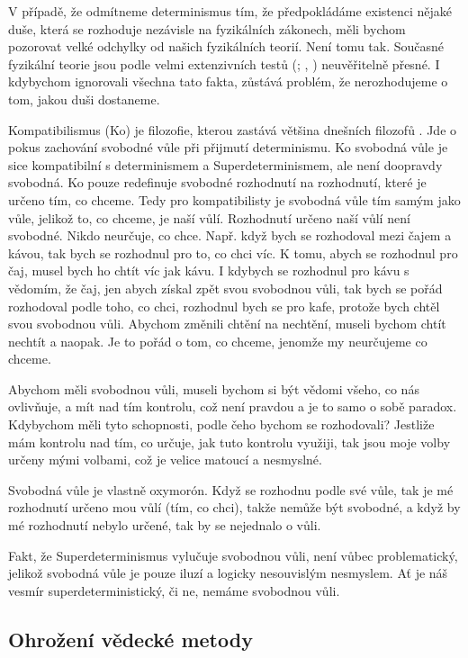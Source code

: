 V případě, že odmítneme determinismus tím, že předpokládáme existenci nějaké duše, která se rozhoduje nezávisle na fyzikálních zákonech, měli bychom pozorovat velké odchylky od našich fyzikálních teorií. Není tomu tak. Současné fyzikální teorie jsou podle velmi extenzivních testů (\cite{GenRelAcc}; , \cite*{QEDAcc}) neuvěřitelně přesné. I kdybychom ignorovali všechna tato fakta, zůstává problém, že nerozhodujeme o tom, jakou duši dostaneme.

Kompatibilismus (Ko) je filozofie, kterou zastává většina dnešních filozofů \parencite{FWSur}. Jde o pokus zachování svobodné vůle při přijmutí determinismu. Ko svobodná vůle je sice kompatibilní s determinismem a Superdeterminismem, ale není doopravdy svobodná. Ko pouze redefinuje svobodné rozhodnutí na rozhodnutí, které je určeno tím, co chceme. Tedy pro kompatibilisty je svobodná vůle tím samým jako vůle, jelikož to, co chceme, je naší vůlí. Rozhodnutí určeno naší vůlí není svobodné. Nikdo neurčuje, co chce. Např. když bych se rozhodoval mezi čajem a kávou, tak bych se rozhodnul pro to, co chci víc. K tomu, abych se rozhodnul pro čaj, musel bych ho chtít víc jak kávu. I kdybych se rozhodnul pro kávu s vědomím, že  čaj, jen abych získal zpět svou svobodnou vůli, tak bych se pořád rozhodoval podle toho, co chci, rozhodnul bych se pro kafe, protože bych chtěl  svou svobodnou vůli. Abychom změnili chtění na nechtění, museli bychom chtít nechtít a naopak. Je to pořád o tom, co chceme, jenomže my neurčujeme co chceme.

Abychom měli svobodnou vůli, museli bychom si být vědomi všeho, co nás ovlivňuje, a mít nad tím kontrolu, což není pravdou a je to samo o sobě paradox. Kdybychom měli tyto schopnosti, podle čeho bychom se rozhodovali? Jestliže mám kontrolu nad tím, co určuje, jak tuto kontrolu využiji, tak jsou moje volby určeny mými volbami, což je velice matoucí a nesmyslné.

Svobodná vůle je vlastně oxymorón. Když se rozhodnu podle své vůle, tak je mé rozhodnutí určeno mou vůlí (tím, co chci), takže nemůže být svobodné, a když by mé rozhodnutí nebylo určené, tak by se nejednalo o vůli.

Fakt, že Superdeterminismus vylučuje svobodnou vůli, není vůbec problematický, jelikož svobodná vůle je pouze iluzí a logicky nesouvislým nesmyslem. Ať je náš vesmír superdeterministický, či ne, nemáme svobodnou vůli.

\clearpage

\subsection{Ohrožení vědecké metody}

